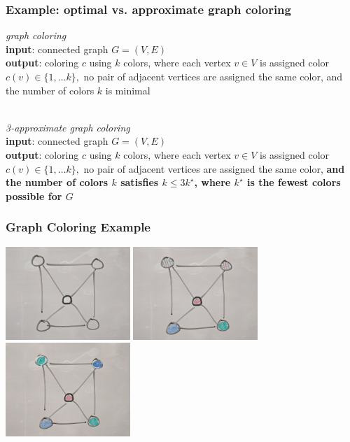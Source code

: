 \documentclass[10pt,aspectratio=169]{beamer}
\newcommand{\stanza}{ \\~\ }
\begin{document}
\begin{frame} \frametitle{Example: optimal vs. approximate graph coloring}
\emph{graph coloring} \\
\textbf{input}: connected graph $G=(V,E)$ \\
\textbf{output}: coloring $c$ using $k$ colors, where each vertex $v \in V$ is assigned color
  $c(v) \in \{1, \ldots k\},$ no pair of adjacent vertices are assigned the
  same color, and the number of colors $k$ is minimal
\stanza

\emph{3-approximate graph coloring} \\
\textbf{input}: connected graph $G=(V,E)$ \\
\textbf{output}: coloring $c$ using $k$ colors, where each vertex $v \in V$ is assigned color
  $c(v) \in \{1, \ldots k\},$ no pair of adjacent vertices are assigned the
  same color, \textbf{and the number of colors $k$ satisfies $k \leq 3 k^\star$,
  where $k^\star$ is the fewest colors possible for $G$}
\end{frame}

\begin{frame} \frametitle{Graph Coloring Example}
  \begin{center}
    \includegraphics[height=100pt]{13-graph-uncolored.jpg}
    \includegraphics[height=100pt]{13-graph-colored-suboptimal.jpg}
    \includegraphics[height=100pt]{13-graph-colored-optimal.jpg}
  \end{center}
\end{frame}
\end{document}
